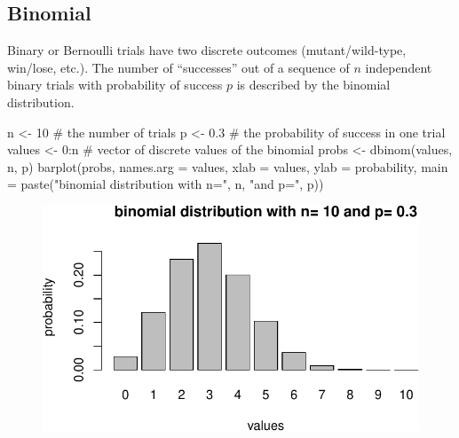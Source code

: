 \documentclass[
  letterpaper,
  DIV=11,
  numbers=noendperiod]{scrreprt}
\newenvironment{Shaded}{\begin{snugshade}}{\end{snugshade}}
\newcommand{\AttributeTok}[1]{\textcolor[rgb]{0.40,0.45,0.13}{#1}}
\newcommand{\CommentTok}[1]{\textcolor[rgb]{0.37,0.37,0.37}{#1}}
\newcommand{\DecValTok}[1]{\textcolor[rgb]{0.68,0.00,0.00}{#1}}
\newcommand{\FloatTok}[1]{\textcolor[rgb]{0.68,0.00,0.00}{#1}}
\newcommand{\FunctionTok}[1]{\textcolor[rgb]{0.28,0.35,0.67}{#1}}
\newcommand{\NormalTok}[1]{\textcolor[rgb]{0.00,0.23,0.31}{#1}}
\newcommand{\OtherTok}[1]{\textcolor[rgb]{0.00,0.23,0.31}{#1}}
\newcommand{\SpecialCharTok}[1]{\textcolor[rgb]{0.37,0.37,0.37}{#1}}
\newcommand{\StringTok}[1]{\textcolor[rgb]{0.13,0.47,0.30}{#1}}
\begin{document}
\hypertarget{binomial}{%
\subsection{Binomial}\label{binomial}}

Binary or Bernoulli trials have two discrete outcomes (mutant/wild-type,
win/lose, etc.). The number of ``successes'' out of a sequence of \(n\)
independent binary trials with probability of success \(p\) is described
by the binomial distribution.

\begin{Shaded}
\begin{Highlighting}[]
\NormalTok{n }\OtherTok{\textless{}{-}} \DecValTok{10} \CommentTok{\# the number of trials}
\NormalTok{p }\OtherTok{\textless{}{-}} \FloatTok{0.3} \CommentTok{\# the probability of success in one trial}
\NormalTok{values }\OtherTok{\textless{}{-}} \DecValTok{0}\SpecialCharTok{:}\NormalTok{n }\CommentTok{\# vector of discrete values of the binomial}
\NormalTok{probs }\OtherTok{\textless{}{-}} \FunctionTok{dbinom}\NormalTok{(values, n, p)}
\FunctionTok{barplot}\NormalTok{(probs, }\AttributeTok{names.arg =}\NormalTok{ values, }\AttributeTok{xlab =} \StringTok{\textquotesingle{}values\textquotesingle{}}\NormalTok{, }\AttributeTok{ylab =} \StringTok{\textquotesingle{}probability\textquotesingle{}}\NormalTok{,}
        \AttributeTok{main =} \FunctionTok{paste}\NormalTok{(}\StringTok{"binomial distribution with n="}\NormalTok{, n, }\StringTok{"and p="}\NormalTok{, p))}
\end{Highlighting}
\end{Shaded}

\begin{figure}[H]

{\centering \includegraphics{./04-distributions_files/figure-pdf/unnamed-chunk-3-1.pdf}

}

\end{figure}
\end{document}
